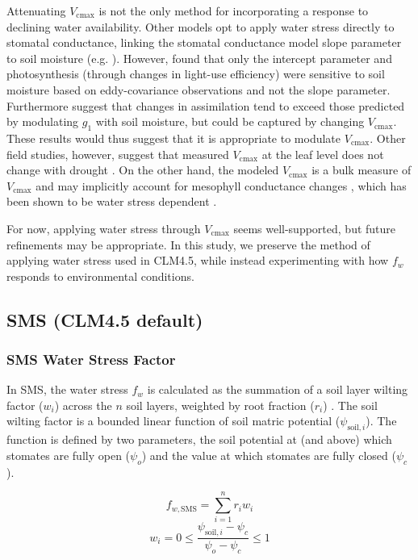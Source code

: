 \documentclass[draft,linenumbers]{agujournal}
\begin{document}
    Attenuating $V_{\text{cmax}}$ is not the only method for incorporating a response to declining water availability. 
    Other models opt to apply water stress directly to stomatal conductance, linking the stomatal conductance model slope parameter to soil moisture 
    (e.g. \cite{dekauwe2015}).
     However, \cite{lin2018} found that only the intercept parameter and photosynthesis (through changes in light-use efficiency) were sensitive to soil moisture based on eddy-covariance observations and not the slope parameter.
    Furthermore \cite{zhou2013} suggest that changes in assimilation tend to exceed those predicted by modulating $g_1$ with soil moisture, but could be captured by changing $V_{\text{cmax}}$. These results would thus suggest that it is appropriate to modulate $V_{\text{cmax}}$.
    Other field studies, however, suggest that measured $V_{\text{cmax}}$ at the leaf level does not change with drought \citep{flexas2004}. 
    On the other hand, the modeled $V_{\text{cmax}}$ is a bulk measure of $V_{\text{cmax}}$ and may implicitly account for mesophyll conductance changes \citep{rogers2017}, which has been shown to be water stress dependent \citep{flexas2012}.

    For now, applying water stress through $V_{\text{cmax}}$ seems well-supported, but future refinements may be appropriate.
    In this study, we preserve the method of applying water stress used in CLM4.5, while instead experimenting with how $f_w$ responds to environmental conditions.
    
    \subsection{SMS (CLM4.5 default)}
    \label{sect:sms}
    \subsubsection{SMS Water Stress Factor}
    \label{sect:fwsms}
    
    In SMS, the water stress $f_w$ is calculated as the summation of a soil layer wilting factor ($w_i$) across the $n$ soil layers, weighted by root fraction ($r_i$) \citep{oleson2013}.
    The soil wilting factor is a bounded linear function of soil matric potential ($\psi_{\text{soil},i}$).
    The function is defined by two parameters, the soil potential at (and above) which stomates are fully open ($\psi_o$) and the value at which stomates are fully closed ($\psi_c$).  

    \begin{linenomath*}
    \begin{equation}
     f_{w,\text{SMS}} = \sum_{i=1}^{n}{r_iw_i}
    \label{bt:1}
    \end{equation}
    \begin{equation} 
    \label{bt:2}
    w_i=0 \leq \dfrac{\psi_{\text{soil},i}-\psi_{c}}{\psi_{o}-\psi_{c}} \leq 1
    \end{equation}
    \end{linenomath*}
    
\end{document}
